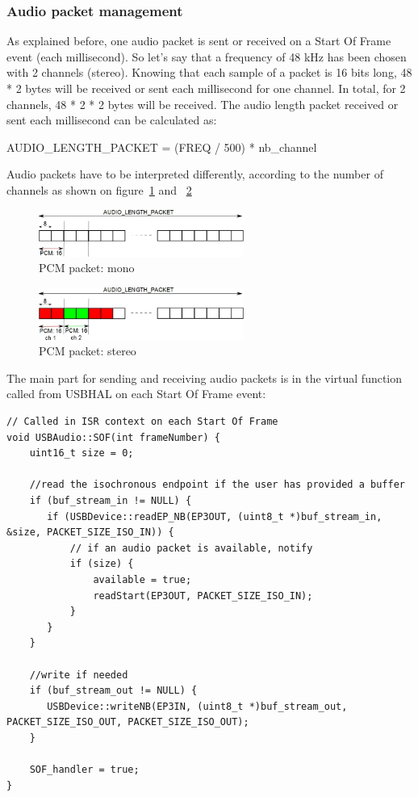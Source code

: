 \documentclass[pdftex,10pt,a4paper]{report}
\begin{document}
\subsubsection{Audio packet management}
As explained before, one audio packet is sent or received on a Start Of Frame event (each millisecond). So let's say that a frequency of 48 kHz has been chosen with 2 channels (stereo). Knowing that each sample of a packet is 16 bits long, 48 * 2 bytes will be received or sent each millisecond for one channel. In total, for 2 channels, 48 * 2 * 2 bytes will be received. The audio length packet received or sent each millisecond can be calculated as:
\begin{center}
	AUDIO\_LENGTH\_PACKET = (FREQ / 500) * nb\_channel
\end{center}

Audio packets have to be interpreted differently, according to the number of channels as shown on figure~\ref{PCM packet: mono} and ~\ref{PCM packet: stereo}

\begin{figure}[h!]
		\centering
		\includegraphics[width=0.6\textwidth]{./pcm.jpg}
		\caption{PCM packet: mono}
		\label{PCM packet: mono}
\end{figure}

\begin{figure}[h!]
		\centering
		\includegraphics[width=0.6\textwidth]{./pcm_stereo.jpg}
		\caption{PCM packet: stereo}
		\label{PCM packet: stereo}
\end{figure}


The main part for sending and receiving audio packets is in the virtual function called from USBHAL on each Start Of Frame event:
\begin{lstlisting}[label=Audio packets management in SOF events,caption=Audio packets management in SOF events]
// Called in ISR context on each Start Of Frame
void USBAudio::SOF(int frameNumber) {
    uint16_t size = 0;
    
    //read the isochronous endpoint if the user has provided a buffer
    if (buf_stream_in != NULL) {
       if (USBDevice::readEP_NB(EP3OUT, (uint8_t *)buf_stream_in, &size, PACKET_SIZE_ISO_IN)) {
           // if an audio packet is available, notify
           if (size) {
               available = true;
               readStart(EP3OUT, PACKET_SIZE_ISO_IN);
           }
       }
    }
    
    //write if needed
    if (buf_stream_out != NULL) {
       USBDevice::writeNB(EP3IN, (uint8_t *)buf_stream_out, PACKET_SIZE_ISO_OUT, PACKET_SIZE_ISO_OUT);
    }

    SOF_handler = true;
}
\end{lstlisting}
\end{document}
